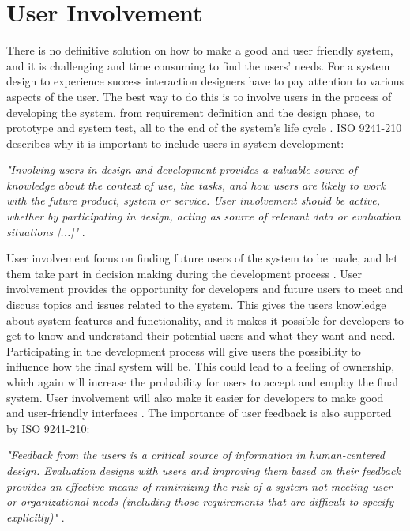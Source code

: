 \section{User Involvement}
\label{sec:userinvolvement}
There is no definitive solution on how to make a good and user friendly system, and it is challenging and time consuming to find the users' needs. For a system design to experience success interaction designers have to pay attention to various aspects of the user. The best way to do this is to involve users in the process of developing the system, from requirement definition and the design phase, to prototype and system test, all to the end of the system's life cycle \cite{mmi}. ISO 9241-210 describes why it is important to include users in system development:

\emph{"Involving users in design and development provides a valuable source of knowledge about the context of use, the tasks, and how users are likely to work with the future product, system or service. User involvement should be active, whether by participating in design, acting as source of relevant data or evaluation situations [...]"} \cite{dis20109241}.

User involvement focus on finding future users of the system to be made, and let them take part in decision making during the development process \cite{bjerknes1995user}. User involvement provides the opportunity for developers and future users to meet and discuss topics and issues related to the system. This gives the users knowledge about system features and functionality, and it makes it possible for developers to get to know and understand their potential users and what they want and need. Participating in the development process will give users the possibility to influence how the final system will be. This could lead to a feeling of ownership, which again will increase the probability for users to accept and employ the final system. User involvement will also make it easier for developers to make good and user-friendly interfaces \cite{infodesign} \cite{mmi}. The importance of user feedback is also supported by ISO 9241-210:

\emph{"Feedback from the users is a critical source of information in human-centered design. Evaluation designs with users and improving them based on their feedback provides an effective means of minimizing the risk of a system not meeting user or organizational needs (including those requirements that are difficult to specify explicitly)"} \cite{dis20109241}.

